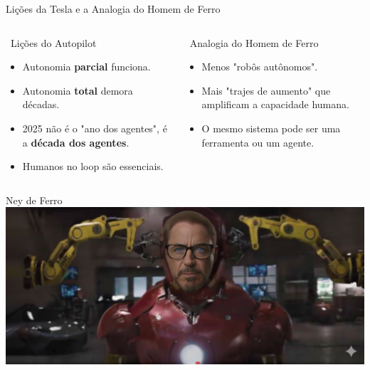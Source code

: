 \documentclass[aspectratio=169,12pt]{beamer}
\begin{document}
\begin{frame}{Lições da Tesla e a Analogia do Homem de Ferro}
    \begin{columns}
        \begin{column}{0.5\textwidth}
            \begin{block}{\faCar\, Lições do Autopilot}
                \begin{itemize}
                    \item Autonomia \textbf{parcial} funciona.
                    \item Autonomia \textbf{total} demora décadas.
                    \item 2025 não é o "ano dos agentes", é a \textbf{década dos agentes}.
                    \item Humanos no loop são essenciais.
                \end{itemize}
            \end{block}
        \end{column}
        \begin{column}{0.5\textwidth}
            \begin{exampleblock}{\faUserTie\, Analogia do Homem de Ferro}
                \begin{itemize}
                    \item Menos "robôs autônomos".
                    \item Mais "trajes de aumento" que amplificam a capacidade humana.
                    \item O mesmo sistema pode ser uma ferramenta ou um agente.
                \end{itemize}
            \end{exampleblock}
        \end{column}
    \end{columns}
\end{frame}
\begin{frame}{Ney de Ferro}
    \includegraphics[scale=0.3]{neydeferro.png}
\end{frame}
\end{document}
